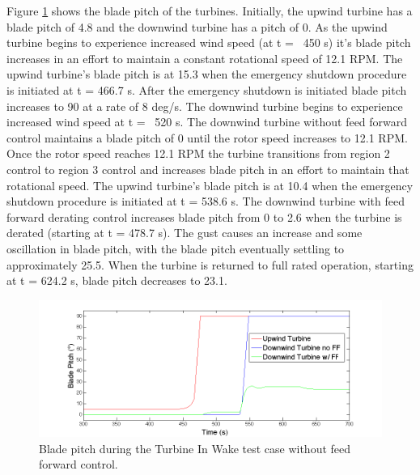 Figure \ref{fig6-30} shows the blade pitch of the turbines. Initially, the upwind turbine has a blade pitch of 4.8\degree{} and the downwind turbine has a pitch of 0\degree. As the upwind turbine begins to experience increased wind speed (at t = ~450 s) it's blade pitch increases in an effort to maintain a constant rotational speed of 12.1 RPM. The upwind turbine's blade pitch is at 15.3\degree{} when the emergency shutdown procedure is initiated at t = 466.7 s. After the emergency shutdown is initiated blade pitch increases to 90\degree{} at a rate of 8 deg/s. The downwind turbine begins to experience increased wind speed at t = ~520 s. The downwind turbine without feed forward control maintains a blade pitch of 0\degree{} until the rotor speed increases to 12.1 RPM. Once the rotor speed reaches 12.1 RPM the turbine transitions from region 2 control to region 3 control and increases blade pitch in an effort to maintain that rotational speed. The upwind turbine's blade pitch is at 10.4\degree{} when the emergency shutdown procedure is initiated at t = 538.6 s. The downwind turbine with feed forward derating control increases blade pitch from 0\degree{} to 2.6\degree{} when the turbine is derated (starting at t = 478.7 s). The gust causes an increase and some oscillation in blade pitch, with the blade pitch eventually settling to approximately 25.5\degree. When the turbine is returned to full rated operation, starting at t = 624.2 s, blade pitch decreases to 23.1\degree.

\begin{figure}[ht] 
	\centering
		\includegraphics[width = \linewidth]{Figures/ch6Figures/fig6-30.png}

	\caption{Blade pitch during the Turbine In Wake test case without feed forward control.}
	\label{fig6-30}
\end{figure}

